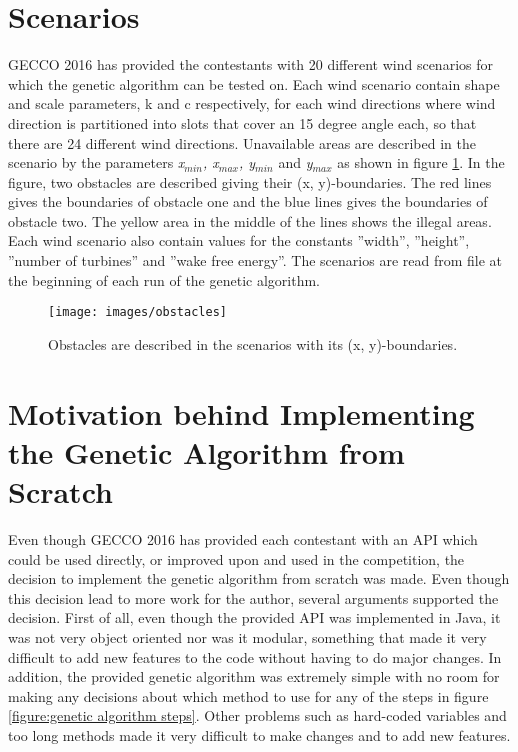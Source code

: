 \section{Scenarios}\label{section:scenarios}
GECCO 2016 has provided the contestants with 20 different wind scenarios for which the genetic algorithm can be tested on. Each wind scenario contain shape and scale parameters, k and c respectively, for each wind directions where wind direction is partitioned into slots that cover an 15 degree angle each, so that there are 24 different wind directions. Unavailable areas are described in the scenario by the parameters \textit{x$_{min}$, x$_{max}$, y$_{min}$} and \textit{y$_{max}$} as shown in figure \ref{figure:obstacles}. In the figure, two obstacles are described giving their (x, y)-boundaries. The red lines gives the boundaries of obstacle one and the blue lines gives the boundaries of obstacle two. The yellow area in the middle of the lines shows the illegal areas. Each wind scenario also contain values for the constants ''width'', ''height'', ''number of turbines'' and ''wake free energy''. The scenarios are read from file at the beginning of each run of the genetic algorithm. 


\begin{figure}[h!]
\begin{center}
\texttt{[image: images/obstacles]}
\caption{Obstacles are described in the scenarios with its (x, y)-boundaries.}
\label{figure:obstacles}
\end{center}
\end{figure}


\section{Motivation behind Implementing the Genetic Algorithm from Scratch}\label{section:motivation}
Even though GECCO	 2016 has provided each contestant with an API which could be used directly, or improved upon and used in the competition, the decision to implement the genetic algorithm from scratch was made. Even though this decision lead to more work for the author, several arguments supported the decision. First of all, even though the provided API was implemented in Java, it was not very object oriented nor was it modular, something that made it very difficult to add new features to the code without having to do major changes. In addition, the provided genetic algorithm was extremely simple with no room for making any decisions about which method to use for any of the steps in figure \ref{figure:genetic algorithm steps}. Other problems such as hard-coded variables and too long methods made it very difficult to make changes and to add new features. \\

